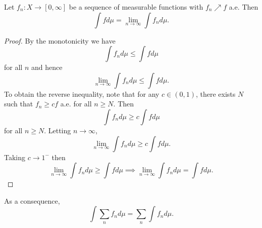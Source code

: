 \begin{theorem}
    Let $f_n:X\to[0,\infty]$ be a sequence of measurable functions with 
    $f_n\nearrow f$ a.e. Then
    \begin{equation*}
        \int fd\mu = \lim_{n\to\infty}\int f_nd\mu.
    \end{equation*}
\end{theorem}
\begin{proof}
    By the monotonicity we have 
    \begin{equation*}
        \int f_nd\mu \leq \int fd\mu
    \end{equation*}
    for all $n$ and hence 
    \begin{equation*}
        \lim_{n\to\infty}\int f_nd\mu \leq \int fd\mu.
    \end{equation*}
    To obtain the reverse inequality, note that for any $c\in(0,1)$, 
    there exists $N$ such that $f_n\geq cf$ a.e. for all $n\geq N$. 
    Then 
    \begin{equation*}
        \int f_nd\mu \geq c\int fd\mu
    \end{equation*}
    for all $n\geq N$. Letting $n\to\infty$, 
    \begin{equation*}
        \lim_{n\to\infty}\int f_nd\mu \geq c\int fd\mu.
    \end{equation*}
    Taking $c\to 1^-$ then 
    \begin{equation*}
        \lim_{n\to\infty}\int f_nd\mu \geq \int fd\mu
        \implies \lim_{n\to\infty}\int f_nd\mu = \int fd\mu.
    \end{equation*}
\end{proof}
\begin{remark}
    As a consequence,
    \begin{equation*}
        \int \sum_n f_nd\mu = \sum_n \int f_nd\mu.
    \end{equation*}
\end{remark}

